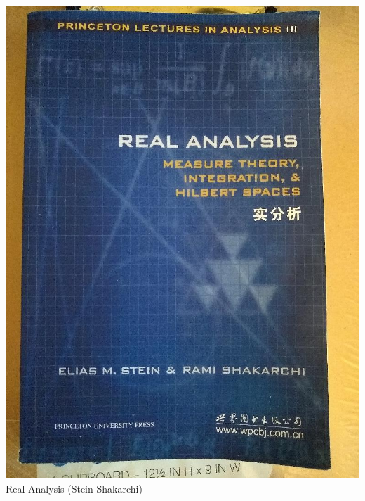 \documentclass[t]{beamer}
\newcommand{\htarget}[2]{\hypertarget{#1}{#2}}
\begin{document}
\begin{frame}\htarget{RASS}{} \begin{center}
\includegraphics[height=0.8\textheight]{Real_Analysis_Stein_Shakarchi_mini.jpg} \\
Real Analysis (Stein Shakarchi)
\end{center} \end{frame}
\end{document}
